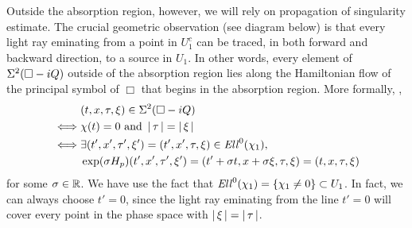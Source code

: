\documentclass[12pt]{article}
\begin{document}
    Outside the absorption region, however, we will rely on propagation of singularity estimate. The crucial geometric observation (see diagram below) is that every light ray eminating from a point in $U_1^c$ can be traced, in both forward and backward direction, to a source in $U_1$. In other words, every element of $\Sigma^2(\Box - iQ)$ outside of the absorption region lies along the Hamiltonian flow of the principal symbol of $\Box$ that begins in the absorption region. More formally, ,  
    \begin{align*}
    &(t, x, \tau, \xi) \in \Sigma^2(\Box - iQ) \\
    \iff & \chi(t) = 0 \text{ and } \left|\, \tau\,\right| = \left|\, \xi\,\right|\\
    \iff & \exists (t', x', \tau', \xi') = (t', x', \tau, \xi) \in \mathit{Ell}^0(\chi_1), \\
    & \exp(\sigma H_p)(t', x', \tau', \xi') = (t' + \sigma t, x + \sigma \xi, \tau, \xi) = (t, x, \tau, \xi)
    \end{align*}
    for some $\sigma  \in {\ensuremath {\mathbb R}}$. We have use the fact that $\mathit{Ell}^0(\chi_1) = \left\{\chi_1 \neq 0 \right\} \subset U_1$. In fact, we can always choose $t' = 0$, since the light ray eminating from the line $t' = 0$ will cover every point in the phase space with $\left|\, \xi\,\right| = \left|\, \tau\,\right|$. \\
    
\end{document}
